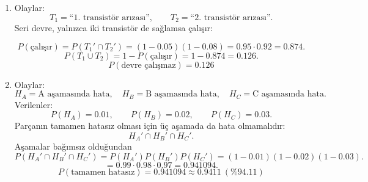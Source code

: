 \documentclass[12pt,a4paper]{article}
\begin{document}
\begin{enumerate}
\begin{center}
\end{center}
\begin{enumerate}
\item
\[
P(\text{1. parça kusurlu})=\frac{3}{30}=\frac{1}{10}.
\]
\item
Birinci parça kusurlu seçildiyse toplam parça sayısı $29$'a düşer ve kusurlu parça sayısı $2$ kalır (geri koyma yok).
Bu nedenle koşullu olasılık
\[
P(\text{2. parça kusurlu}\mid \text{1. parça kusurlu})=\frac{2}{29}.
\]
\item Çarpma kuralı:
``İki parça da kusurlu'' olayı, birinci parçanın kusurlu gelmesi ve bunun ardından ikinci parçanın (birinci kusurlu iken) kusurlu gelmesi olaylarının birlikte gerçekleşmesidir.
Bu yüzden
\[
P(K_1\cap K_2)=P(K_1)\,P(K_2\mid K_1)
\]
yazılır.
\[
P(\text{iki parça da kusurlu})
=\frac{3}{30}\cdot\frac{2}{29}
=\frac{1}{145}\approx 0.006897.
\]
\[
\boxed{P(\text{iki parça da kusurlu})=\frac{1}{145}\approx 0.006897}
\]
\end{enumerate}

\item Olaylar:
\[
T_1=\text{``1. transistör arızası''},\qquad T_2=\text{``2. transistör arızası''}.
\]
Seri devre, yalnızca iki transistör de sağlamsa çalışır:
\begin{center}
\end{center}
\[
P(\text{çalışır})=P(T_1'\cap T_2')=(1-0.05)(1-0.08)=0.95\cdot 0.92=0.874.
\]
\[
P(T_1\cup T_2)=1-P(\text{çalışır})=1-0.874=0.126.
\]
\[
\boxed{P(\text{devre çalışmaz})=0.126}
\]

\item Olaylar:
\[
H_A=\text{A aşamasında hata},\quad
H_B=\text{B aşamasında hata},\quad
H_C=\text{C aşamasında hata}.
\]
Verilenler:
\[
P(H_A)=0.01,\qquad P(H_B)=0.02,\qquad P(H_C)=0.03.
\]
Parçanın tamamen hatasız olması için üç aşamada da hata olmamalıdır:
\[
H_A'\cap H_B'\cap H_C'.
\]
Aşamalar bağımsız olduğundan
\[
P(H_A'\cap H_B'\cap H_C')
=P(H_A')P(H_B')P(H_C')
=(1-0.01)(1-0.02)(1-0.03).
\]
\[
=0.99\cdot 0.98\cdot 0.97
=0.941094.
\]
\[
\boxed{P(\text{tamamen hatasız})=0.941094\approx 0.9411\ (\%94.11)}
\]


\end{enumerate}
\end{document}
